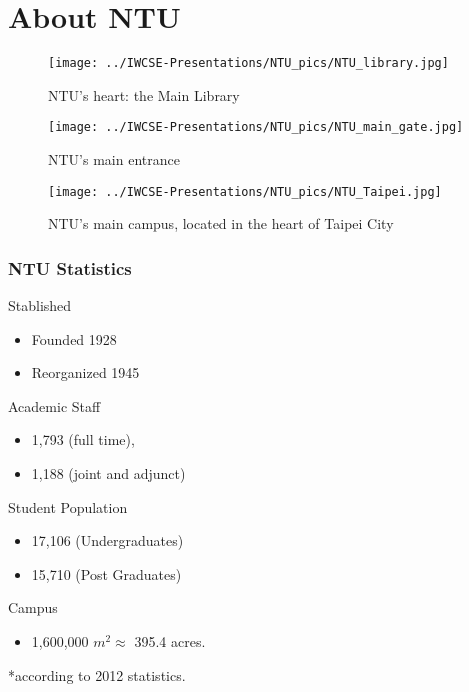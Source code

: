 \section*{About NTU}

\begin{frame}
\begin{figure}
 \centering
 \texttt{[image: ../IWCSE-Presentations/NTU\_pics/NTU\_library.jpg]}
 \caption{NTU's heart: the Main Library}
 \label{fig:NTU_library}
\end{figure}
\end{frame}

\begin{frame}
\begin{figure}
 \centering
 \texttt{[image: ../IWCSE-Presentations/NTU\_pics/NTU\_main\_gate.jpg]}
 \caption{NTU's main entrance}
 \label{fig:NTU_main_gate}
\end{figure}
\end{frame}

\begin{frame}
\begin{figure}
 \centering
 \texttt{[image: ../IWCSE-Presentations/NTU\_pics/NTU\_Taipei.jpg]}
 \caption{NTU's main campus, located in the heart of Taipei City}
 \label{fig:NTU_Taipei}
\end{figure}
\end{frame}

\begin{frame} \frametitle{NTU Statistics}
 \begin{orangeitemize}
  \item Stablished
    \begin{itemize}
     \item Founded 1928
     \item Reorganized 1945
    \end{itemize}
  \item Academic Staff
    \begin{itemize}
     \item 1,793 (full time),
     \item 1,188 (joint and adjunct)
    \end{itemize}
  \item Student Population
    \begin{itemize}
     \item 17,106 (Undergraduates)
     \item 15,710 (Post Graduates)
    \end{itemize}
  \item Campus
    \begin{itemize}
     \item 1,600,000 $m^2 \approx$ 395.4 acres.
    \end{itemize}
 \end{orangeitemize}
 *according to 2012 statistics.
\end{frame}

